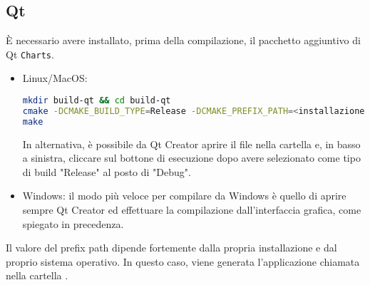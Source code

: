 \subsection{Qt}
È necessario avere installato, prima della compilazione, il pacchetto aggiuntivo di Qt \texttt{Charts}.
\begin{itemize}
	\item Linux/MacOS: 
	\begin{lstlisting}[language=Bash]
mkdir build-qt && cd build-qt
cmake -DCMAKE_BUILD_TYPE=Release -DCMAKE_PREFIX_PATH=<installazione di Qt>/<versione>/<sistema> ../QTInterface
make \end{lstlisting}
In alternativa, è possibile da Qt Creator aprire il file  nella cartella  e, in basso a sinistra, cliccare sul bottone di esecuzione dopo avere selezionato come tipo di build "Release" al posto di "Debug".

\item Windows: il modo più veloce per compilare da Windows è quello di aprire sempre Qt Creator ed effettuare la compilazione dall'interfaccia grafica, come spiegato in precedenza.
\end{itemize}
Il valore del prefix path dipende fortemente dalla propria installazione e dal proprio sistema operativo. In questo caso, viene generata l'applicazione chiamata  nella cartella .